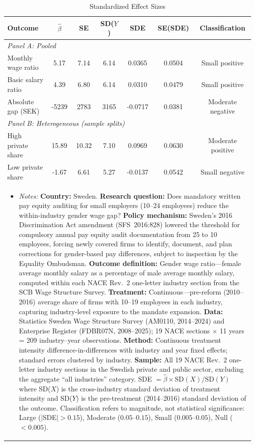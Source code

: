 \begin{table}[t]
\centering
\caption{Standardized Effect Sizes}
\label{tab:sde}
\begin{tabular}{lcccccc}
\hline\hline
Outcome & $\hat{\beta}$ & SE & SD($Y$) & SDE & SE(SDE) & Classification \\
\hline
\multicolumn{7}{l}{\textit{Panel A: Pooled}} \\[3pt]
Monthly wage ratio & 5.17 & 7.14 & 6.14 & 0.0365 & 0.0504 & Small positive \\
Basic salary ratio & 4.39 & 6.80 & 6.14 & 0.0310 & 0.0479 & Small positive \\
Absolute gap (SEK) & -5239 & 2783 & 3165 & -0.0717 & 0.0381 & Moderate negative \\[6pt]
\multicolumn{7}{l}{\textit{Panel B: Heterogeneous (sample splits)}} \\[3pt]
High private share & 15.89 & 10.32 & 7.10 & 0.0969 & 0.0630 & Moderate positive \\
Low private share & -1.67 & 6.61 & 5.27 & -0.0137 & 0.0542 & Small negative \\
\hline\hline
\multicolumn{7}{p{0.95\textwidth}}{\footnotesize \begin{itemize}[leftmargin=*,nosep] \item \textit{Notes:} \textbf{Country:} Sweden. \textbf{Research question:} Does mandatory written pay equity auditing for small employers (10--24 employees) reduce the within-industry gender wage gap? \textbf{Policy mechanism:} Sweden's 2016 Discrimination Act amendment (SFS~2016:828) lowered the threshold for compulsory annual pay equity audit documentation from 25 to 10 employees, forcing newly covered firms to identify, document, and plan corrections for gender-based pay differences, subject to inspection by the Equality Ombudsman. \textbf{Outcome definition:} Gender wage ratio---female average monthly salary as a percentage of male average monthly salary, computed within each NACE Rev.~2 one-letter industry section from the SCB Wage Structure Survey. \textbf{Treatment:} Continuous---pre-reform (2010--2016) average share of firms with 10--19 employees in each industry, capturing industry-level exposure to the mandate expansion. \textbf{Data:} Statistics Sweden Wage Structure Survey (AM0110, 2014--2024) and Enterprise Register (FDBR07N, 2008--2025); 19 NACE sections $\times$ 11 years = 209 industry--year observations. \textbf{Method:} Continuous treatment intensity difference-in-differences with industry and year fixed effects; standard errors clustered by industry. \textbf{Sample:} All 19 NACE Rev.~2 one-letter industry sections in the Swedish private and public sector, excluding the aggregate ``all industries'' category. SDE $= \hat{\beta} \times \text{SD}(X) / \text{SD}(Y)$ where SD($X$) is the cross-industry standard deviation of treatment intensity and SD($Y$) is the pre-treatment (2014--2016) standard deviation of the outcome. Classification refers to magnitude, not statistical significance: Large ($|$SDE$| > 0.15$), Moderate ($0.05$--$0.15$), Small ($0.005$--$0.05$), Null ($< 0.005$). \end{itemize}} \\
\end{tabular}
\end{table}
